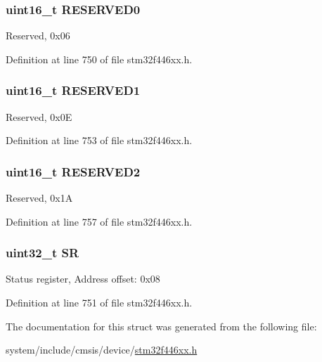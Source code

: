 \subsubsection[{\texorpdfstring{R\+E\+S\+E\+R\+V\+E\+D0}{RESERVED0}}]{\setlength{\rightskip}{0pt plus 5cm}uint16\+\_\+t R\+E\+S\+E\+R\+V\+E\+D0}\hypertarget{struct_s_p_d_i_f_r_x___type_def_a149feba01f9c4a49570c6d88619f504f}{}\label{struct_s_p_d_i_f_r_x___type_def_a149feba01f9c4a49570c6d88619f504f}
Reserved, 0x06 

Definition at line 750 of file stm32f446xx.\+h.

\subsubsection[{\texorpdfstring{R\+E\+S\+E\+R\+V\+E\+D1}{RESERVED1}}]{\setlength{\rightskip}{0pt plus 5cm}uint16\+\_\+t R\+E\+S\+E\+R\+V\+E\+D1}\hypertarget{struct_s_p_d_i_f_r_x___type_def_a8249a3955aace28d92109b391311eb30}{}\label{struct_s_p_d_i_f_r_x___type_def_a8249a3955aace28d92109b391311eb30}
Reserved, 0x0E 

Definition at line 753 of file stm32f446xx.\+h.

\subsubsection[{\texorpdfstring{R\+E\+S\+E\+R\+V\+E\+D2}{RESERVED2}}]{\setlength{\rightskip}{0pt plus 5cm}uint16\+\_\+t R\+E\+S\+E\+R\+V\+E\+D2}\hypertarget{struct_s_p_d_i_f_r_x___type_def_a5573848497a716a9947fd87487709feb}{}\label{struct_s_p_d_i_f_r_x___type_def_a5573848497a716a9947fd87487709feb}
Reserved, 0x1A 

Definition at line 757 of file stm32f446xx.\+h.

\subsubsection[{\texorpdfstring{SR}{SR}}]{ uint32\+\_\+t SR}\hypertarget{struct_s_p_d_i_f_r_x___type_def_af6aca2bbd40c0fb6df7c3aebe224a360}{}\label{struct_s_p_d_i_f_r_x___type_def_af6aca2bbd40c0fb6df7c3aebe224a360}
Status register, Address offset\+: 0x08 

Definition at line 751 of file stm32f446xx.\+h.



The documentation for this struct was generated from the following file\+:\begin{DoxyCompactItemize}
\item 
system/include/cmsis/device/\hyperlink{stm32f446xx_8h}{stm32f446xx.\+h}\end{DoxyCompactItemize}
